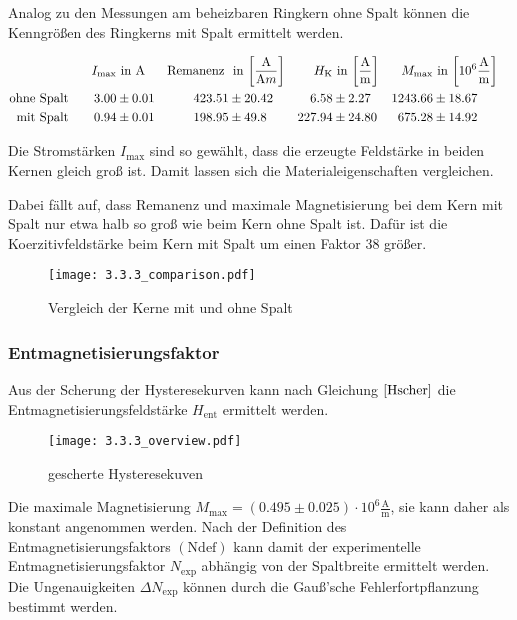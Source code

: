 \documentclass[12pt,a4paper]{scrartcl}
\numberwithin{equation}{section} %
\renewcommand{\[}{} %
\renewcommand{\]}{\noindent} %
\begin{document}
Analog zu den Messungen am beheizbaren Ringkern ohne Spalt können die
Kenngrößen des Ringkerns mit Spalt ermittelt werden.

\[
\begin{align*}
    I_\mathrm{max} &\text{ in } \mathrm A &
        \text{Remanenz } &\text{ in }
            {\tiny \left[ \frac{\mathrm A}{\mathrm Am} \right] } &
        H_\mathrm{K} &\text{ in }
            {\tiny \left[ \frac{\mathrm A}{\mathrm m} \right] } &
        M_\mathrm{max} &\text{ in }
            {\tiny \left[10^6 \frac{\mathrm A}{\mathrm m} \right] }
        \\
    \text{ohne Spalt}\qquad
        3.00 &\pm 0.01 &
        423.51 &\pm 20.42 &
        6.58 &\pm 2.27 &
        1243.66 &\pm 18.67
        \\
    \text{mit Spalt}\qquad
        0.94 &\pm 0.01 &
        198.95 &\pm 49.8 &
        227.94 &\pm 24.80 &
        675.28 &\pm 14.92 &
\end{align*}
\]

Die Stromstärken \(I_\mathrm{max}\) sind so gewählt, dass die erzeugte
Feldstärke in beiden Kernen gleich groß ist. Damit lassen sich die
Materialeigenschaften vergleichen.

Dabei fällt auf, dass Remanenz und maximale Magnetisierung bei dem Kern
mit Spalt nur etwa halb so groß wie beim Kern ohne Spalt ist. Dafür ist
die Koerzitivfeldstärke beim Kern mit Spalt um einen Faktor \(38\)
größer.

\begin{figure}
\centering
\texttt{[image: 3.3.3\_comparison.pdf]}
\caption{Vergleich der Kerne mit und ohne Spalt}
\end{figure}

\hypertarget{entmagnetisierungsfaktor-2}{%
\subsubsection{Entmagnetisierungsfaktor}\label{entmagnetisierungsfaktor-2}}

Aus der Scherung der Hysteresekurven kann nach Gleichung
\(\eqref{Hscher}\) die Entmagnetisierungsfeldstärke \(H_\mathrm{ent}\)
ermittelt werden.

\begin{figure}
\centering
\texttt{[image: 3.3.3\_overview.pdf]}
\caption{gescherte Hysteresekuven}
\end{figure}

Die maximale Magnetisierung
\(M_\mathrm{max} = (0.495\pm 0.025) \cdot 10^6 \mathrm{\frac{A}{m}}\),
sie kann daher als konstant angenommen werden. Nach der Definition des
Entmagnetisierungsfaktors \((\mathrm{Ndef})\) kann damit der
experimentelle Entmagnetisierungsfaktor \(N_\mathrm{exp}\) abhängig von
der Spaltbreite ermittelt werden. Die Ungenauigkeiten
\(\Delta N_\mathrm{exp}\) können durch die Gauß'sche Fehlerfortpflanzung
bestimmt werden.
\end{document}
